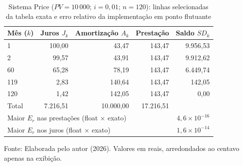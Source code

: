 \begin{table}[htb]
\centering
\small
\caption{Sistema Price ($PV=10\,000$; $i=0{,}01$; $n=120$): linhas selecionadas da tabela exata e erro relativo da implementação em ponto flutuante}
\label{tab:price-validacao}
\begin{tabular}{lrrrr}
\hline
Mês ($k$) & Juros $J_k$ & Amortização $A_k$ & Prestação & Saldo $SD_k$ \\
\hline
1 & 100{,}00 & 43{,}47 & 143{,}47 & 9.956{,}53 \\
2 & 99{,}57 & 43{,}91 & 143{,}47 & 9.912{,}62 \\
60 & 65{,}28 & 78{,}19 & 143{,}47 & 6.449{,}74 \\
119 & 2{,}83 & 140{,}64 & 143{,}47 & 142{,}05 \\
120 & 1{,}42 & 142{,}05 & 143{,}47 & 0{,}00 \\
Total & 7.216{,}51 & 10.000{,}00 & 17.216{,}51 & \\
\hline
\multicolumn{4}{l}{Maior $E_r$ nas prestações (float $\times$ exato)} & $4{,}6\times 10^{-16}$ \\
\multicolumn{4}{l}{Maior $E_r$ nos juros (float $\times$ exato)} & $1{,}6\times 10^{-14}$ \\
\hline
\end{tabular}
\par\vspace{0.1cm}
{\small Fonte: Elaborada pelo autor (2026). Valores em reais, arredondados ao centavo apenas na exibição.}
\end{table}

